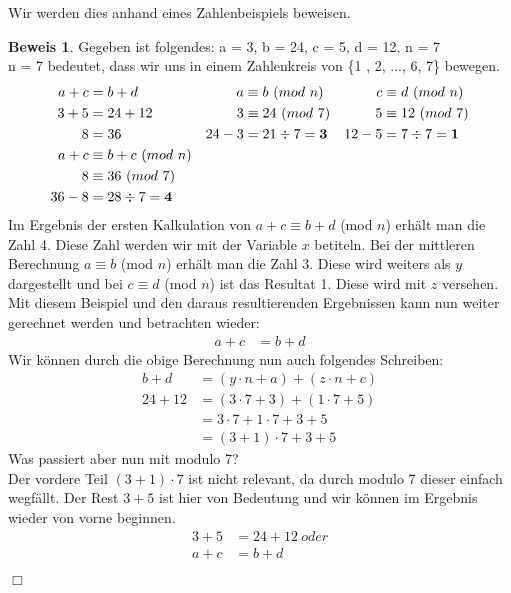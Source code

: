 \documentclass[12pt,a4paper]{article}
\theoremstyle{definition}
\newtheorem{beweis}{Beweis}[subsection]
\begin{document}
\newpage
Wir werden dies anhand eines Zahlenbeispiels beweisen.
\begin{beweis}Gegeben ist folgendes: a = 3, b = 24, c = 5, d = 12,  n = 7\\
n = 7 bedeutet, dass wir uns in einem Zahlenkreis von \{1 , 2, ..., 6, 7\} bewegen.
\begin{align}\setcounter{equation}{0}
a + c  &= b + d                  & a      &\equiv b\ (mod\ n)       & c      &\equiv d\ (mod\ n)     \\
3 + 5  &= 24 + 12                & 3      &\equiv 24\ (mod\ 7)      & 5      &\equiv 12\ (mod\ 7)    \\
8      &= 36                     & 24 - 3 &= 21 \div 7 = \textbf{3} & 12 - 5 &=7 \div 7 = \textbf{1} \\
a + c  &\equiv b + c\ (mod\ n)   &                                  &                                \\ 
8      &\equiv 36\ (mod\ 7)      &                                  &                                \\
36 - 8 &= 28 \div 7 = \textbf{4} &                                  &
\end{align}
Im Ergebnis der ersten Kalkulation von $a + c \equiv b + d$ (mod $n$) erhält man die Zahl 4.
Diese Zahl werden wir mit der Variable $x$ betiteln.
Bei der mittleren Berechnung $a \equiv b$ (mod $n$) erhält man die Zahl 3.
Diese wird weiters als $y$ dargestellt und bei $c \equiv d$ (mod $n$) ist das Resultat 1.
Diese wird mit $z$ versehen.
Mit diesem Beispiel und den daraus resultierenden Ergebnissen kann nun weiter gerechnet werden und betrachten wieder:
\begin{align}
a + c &= b + d
\end{align}
Wir können durch die obige Berechnung nun auch folgendes Schreiben:
\begin{align}
b + d   &= (y \cdot n + a) + (z \cdot n + c) \\
24 + 12 &= (3 \cdot 7 + 3) + (1 \cdot 7 + 5) \\
        &= 3 \cdot 7 + 1 \cdot 7 + 3 + 5     \\
        &= (3 + 1) \cdot 7 + 3 + 5
\end{align}
Was passiert aber nun mit modulo 7?\\
Der vordere Teil $(3 + 1) \cdot 7$ ist nicht relevant, da durch modulo 7 dieser einfach wegfällt.
Der Rest $3 + 5$ ist hier von Bedeutung und wir können im Ergebnis wieder von vorne beginnen.
\begin{align}
3 + 5 &= 24 + 12\ oder \\
a + c &= b + d
\end{align}
\begin{flushright}
$\Box$
\end{flushright}
\end{beweis}
\end{document}
